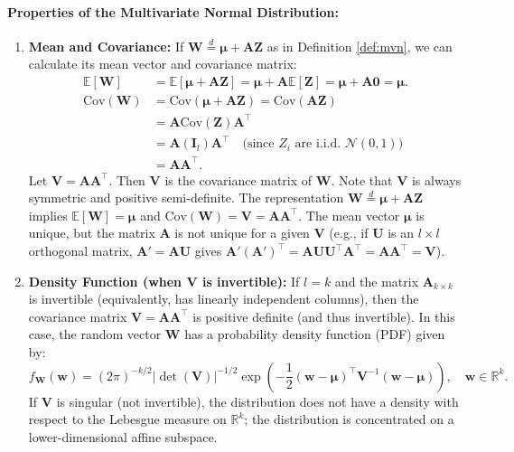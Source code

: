 \documentclass[11pt, letterpaper]{article}
\theoremstyle{plain} %
\theoremstyle{definition} %
\theoremstyle{remark} %
\renewcommand{\mathbf}{\boldsymbol} %
\newcommand{\R}{\mathbb{R}}
\newcommand{\E}{\mathbb{E}}
\newcommand{\Cov}{\mathrm{Cov}} %
\newcommand{\Normal}{\mathcal{N}}
\newcommand{\I}{\mathbf{I}} %
\begin{document}
\paragraph{Properties of the Multivariate Normal Distribution:}

\begin{enumerate}
    \item \textbf{Mean and Covariance:} If $\boldsymbol{W} \stackrel{d}{=} \boldsymbol{\mu} + \boldsymbol{A} \boldsymbol{Z}$ as in Definition \ref{def:mvn}, we can calculate its mean vector and covariance matrix:
    \begin{align*}
    \E[\boldsymbol{W}] &= \E[\boldsymbol{\mu} + \boldsymbol{A}\boldsymbol{Z}] = \boldsymbol{\mu} + \boldsymbol{A}\E[\boldsymbol{Z}] = \boldsymbol{\mu} + \boldsymbol{A}\mathbf{0} = \boldsymbol{\mu}. \\
    \Cov(\boldsymbol{W}) &= \Cov(\boldsymbol{\mu} + \boldsymbol{A}\boldsymbol{Z}) = \Cov(\boldsymbol{A}\boldsymbol{Z}) \\
    &= \boldsymbol{A} \Cov(\boldsymbol{Z}) \boldsymbol{A}^{\top} \\
    &= \boldsymbol{A} (\I_l) \boldsymbol{A}^{\top} \quad \text{(since } Z_i \text{ are i.i.d. } \Normal(0,1)) \\
    &= \boldsymbol{A} \boldsymbol{A}^{\top}.
    \end{align*}
    Let $\boldsymbol{V} = \boldsymbol{A}\boldsymbol{A}^{\top}$. Then $\boldsymbol{V}$ is the covariance matrix of $\boldsymbol{W}$. Note that $\boldsymbol{V}$ is always symmetric and positive semi-definite. The representation $\boldsymbol{W} \stackrel{d}{=} \boldsymbol{\mu} + \boldsymbol{A}\boldsymbol{Z}$ implies $\E[\boldsymbol{W}] = \boldsymbol{\mu}$ and $\Cov(\boldsymbol{W}) = \boldsymbol{V} = \boldsymbol{A}\boldsymbol{A}^{\top}$. The mean vector $\boldsymbol{\mu}$ is unique, but the matrix $\boldsymbol{A}$ is not unique for a given $\boldsymbol{V}$ (e.g., if $\boldsymbol{U}$ is an $l \times l$ orthogonal matrix, $\boldsymbol{A}' = \boldsymbol{A}\boldsymbol{U}$ gives $\boldsymbol{A}'(\boldsymbol{A}')^{\top} = \boldsymbol{A}\boldsymbol{U}\boldsymbol{U}^{\top}\boldsymbol{A}^{\top} = \boldsymbol{A}\boldsymbol{A}^{\top} = \boldsymbol{V}$).

    \item \textbf{Density Function (when $\boldsymbol{V}$ is invertible):} If $l=k$ and the matrix $\boldsymbol{A}_{k \times k}$ is invertible (equivalently, has linearly independent columns), then the covariance matrix $\boldsymbol{V} = \boldsymbol{A}\boldsymbol{A}^{\top}$ is positive definite (and thus invertible). In this case, the random vector $\boldsymbol{W}$ has a probability density function (PDF) given by:
    \[
    f_{\boldsymbol{W}}(\boldsymbol{w}) = (2\pi)^{-k/2} |\det(\boldsymbol{V})|^{-1/2} \exp\left( -\frac{1}{2} (\boldsymbol{w} - \boldsymbol{\mu})^{\top} \boldsymbol{V}^{-1} (\boldsymbol{w} - \boldsymbol{\mu}) \right), \quad \boldsymbol{w} \in \R^k.
    \]
    If $\boldsymbol{V}$ is singular (not invertible), the distribution does not have a density with respect to the Lebesgue measure on $\R^k$; the distribution is concentrated on a lower-dimensional affine subspace.


\end{enumerate}
\end{document}
